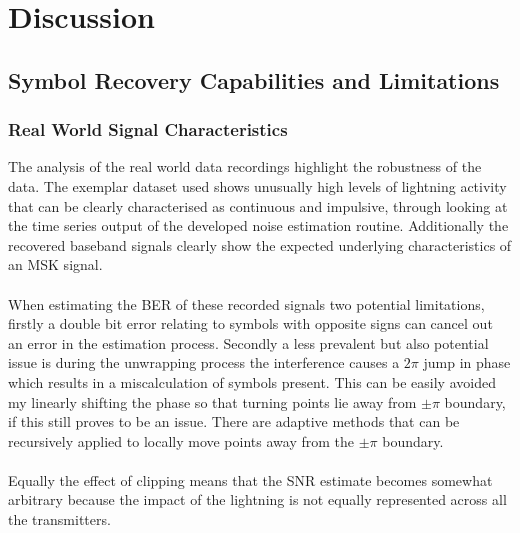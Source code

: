 \chapter{Discussion}

\section{Symbol Recovery Capabilities and Limitations}
\subsection{Real World Signal Characteristics}
The analysis of the real world data recordings highlight the robustness of the data. The exemplar dataset used shows unusually high levels of lightning activity that can be clearly characterised as continuous and impulsive, through looking at the time series output of the developed noise estimation routine. Additionally the recovered baseband signals clearly show the expected underlying characteristics of an MSK signal.  
\\\\
When estimating the BER of these recorded signals two potential limitations, firstly a double bit error relating to symbols with opposite signs can cancel out an error in the estimation process. Secondly a less prevalent but also potential issue is during the unwrapping process the interference causes a $2\pi$ jump in phase which results in a miscalculation of symbols present. This can be easily avoided my linearly shifting the phase so that turning points lie away from $\pm\pi$ boundary, if this still proves to be an issue. There are adaptive methods that can be recursively applied to locally move points away from the $\pm\pi$ boundary. 
\\\\
Equally the effect of clipping means that the SNR estimate becomes somewhat arbitrary because the impact of the lightning is not equally represented across all the transmitters.

